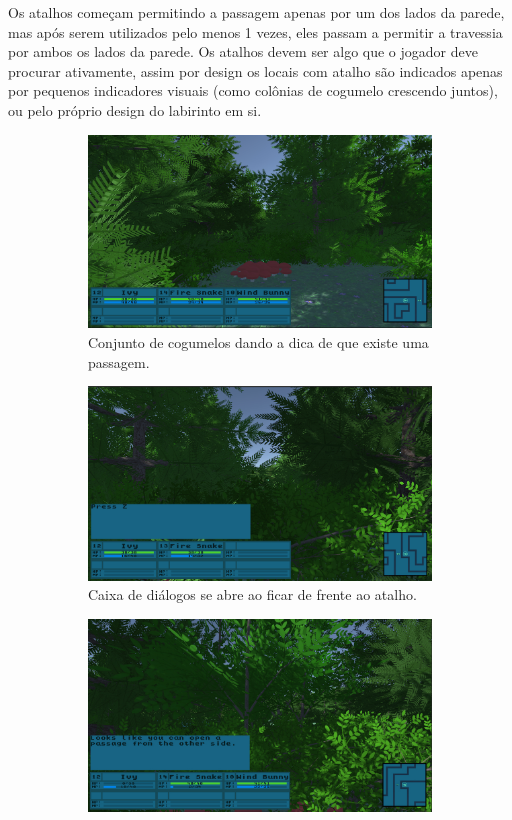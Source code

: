 \documentclass[
	12pt,				%
	openright,			%
	twoside,			%
	a4paper,			%
	english,			%
	french,				%
	spanish,			%
	brazil				%
	]{abntex2}
\begin{document}
	Os atalhos começam permitindo a passagem apenas por um dos lados da parede, mas após serem utilizados pelo menos 1 vezes, eles passam a permitir a travessia por ambos os lados da parede. Os atalhos devem ser algo que o jogador deve procurar ativamente, assim por design os locais com atalho são indicados apenas por pequenos indicadores visuais (como colônias de cogumelo crescendo juntos), ou pelo próprio design do labirinto em si.

\begin{figure}[h!]
  \centering
  \begin{subfigure}[b]{0.47\linewidth}
    \includegraphics[width=\linewidth]{cogumelos.jpg}
     \caption{Conjunto de cogumelos dando a dica de que existe uma passagem.}
  \end{subfigure}
  \begin{subfigure}[b]{0.47\linewidth}
    \includegraphics[width=\linewidth]{prompt.jpg}
    \caption{Caixa de diálogos se abre ao ficar de frente ao atalho.}
  \end{subfigure}
  \begin{subfigure}[b]{0.47\linewidth}
    \includegraphics[width=\linewidth]{warning.jpg}

\end{subfigure}
\end{figure}
\end{document}
